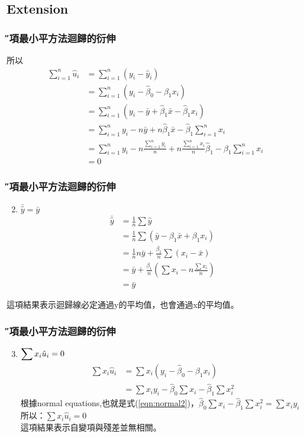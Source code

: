 \documentclass[xcolor=dvipsnames]{beamer}
\begin{document}
\subsection{Extension}
\begin{frame}\frametitle{\H 幾項最小平方法迴歸的衍伸}
所以
\small
\begin{align*}
\sum \limits_{i=1}^n\hat{u}_{i}&= \sum \limits_{i=1}^n(y_{i}-\hat{y}_{i})\\
& = \sum \limits_{i=1}^n(y_{i}-\hat{\beta}_{0}-\hat{\beta}_{1}x_{i})\\
& = \sum \limits_{i=1}^n(y_{i}-\bar{y}+\hat{\beta}_{1}\bar{x}-\hat{\beta}_{1}x_{i})\\
& = \sum \limits_{i=1}^n y_{i}-n\bar{y}+n\hat{\beta}_{1}\bar{x}-\hat{\beta}_{1}\sum \limits_{i=1}^n x_{i}\\
& = \sum \limits_{i=1}^n y_{i}-n\frac{\sum \limits_{i=1}^n y_{i}}{n}+n\frac{\sum \limits_{i=1}^n x_{i}}{n}\hat{\beta}_{1}-\hat{\beta}_{1}\sum \limits_{i=1}^n x_{i}\\
& =0
\end{align*}
\normalsize
\end{frame}
\begin{frame}\frametitle{\H 幾項最小平方法迴歸的衍伸}
\begin{enumerate}
\setcounter{enumi}{1}
\item $\bar{\hat{y}}=\bar{y}  $
\begin{align*}
\bar{\hat{y}} & =\frac{1}{n}\sum \hat{y}\\
& = \frac{1}{n}\sum(\bar{y}-\beta_{1}\bar{x}+\beta_{1}x_{i})\\
& = \frac{1}{n}n\bar{y}+\frac{\beta_{1}}{n}\sum (x_{i}-\bar{x}) \\
& = \bar{y}+\frac{\beta_{1}}{n}(\sum x_{i}-n\frac{\sum x_{i}}{n}) \\
& = \bar{y}
\end{align*}
\end{enumerate}
這項結果表示迴歸線必定通過y的平均值，也會通過x的平均值。
\end{frame}

\begin{frame}\frametitle{\H 幾項最小平方法迴歸的衍伸}
\begin{enumerate}
\setcounter{enumi}{2}
\item $\mathlarger{\sum {x}_{i}\hat{u}_{i}=0}  $
\begin{align*}
\sum x_{i}\hat{u}_{i} & = \sum x_{i}(y_{i}-\hat{\beta}_{0}-\hat{\beta}_{1}x_{i})\\
& = \sum x_{i}y_{i}-\hat{\beta}_{0}\sum x_{i}-\hat{\beta}_{1}\sum x_{i}^2
\end{align*}
根據normal equations,也就是式(\ref{eqn:normal2})，$\hat{\beta}_{0}\sum x_{i}-\hat{\beta}_{1}\sum x_{i}^2=\sum x_{i}y_{i}  $\\
所以：$\sum x_{i}\hat{u}_{i}=0 $\\
這項結果表示自變項與殘差並無相關。
\end{enumerate}
\end{frame}
\end{document}
